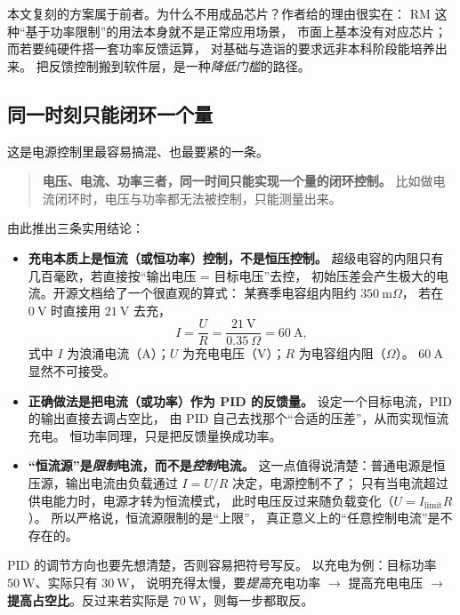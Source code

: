 \documentclass[cn,blue,11pt,device=normal]{elegantnote}
\begin{document}
本文复刻的方案属于前者。为什么不用成品芯片？作者给的理由很实在：
RM 这种“基于功率限制”的用法本身就不是正常应用场景，
市面上基本没有对应芯片；而若要纯硬件搭一套功率反馈运算，
对基础与造诣的要求远非本科阶段能培养出来。
把反馈控制搬到软件层，是一种\emph{降低门槛}的路径。

\subsection{同一时刻只能闭环一个量}

这是电源控制里最容易搞混、也最要紧的一条。

\begin{quote}
\textbf{电压、电流、功率三者，同一时间只能实现一个量的闭环控制。}
比如做电流闭环时，电压与功率都无法被控制，只能测量出来。
\end{quote}

由此推出三条实用结论：

\begin{itemize}
  \item \textbf{充电本质上是恒流（或恒功率）控制，不是恒压控制。}
  超级电容的内阻只有几百毫欧，若直接按“输出电压 = 目标电压”去控，
  初始压差会产生极大的电流。开源文档给了一个很直观的算式：
  某赛季电容组内阻约 $350\ \mathrm{m}\Omega$，
  若在 $0\ \mathrm{V}$ 时直接用 $21\ \mathrm{V}$ 去充，
  \begin{equation}\label{eq:inrush}
    I = \frac{U}{R} = \frac{21\ \mathrm{V}}{0.35\ \Omega} = 60\ \mathrm{A},
  \end{equation}
  式中 $I$ 为浪涌电流（A）；$U$ 为充电电压（V）；$R$ 为电容组内阻（$\Omega$）。
  $60\ \mathrm{A}$ 显然不可接受。
  \item \textbf{正确做法是把电流（或功率）作为 PID 的反馈量。}
  设定一个目标电流，PID 的输出直接去调占空比，
  由 PID 自己去找那个“合适的压差”，从而实现恒流充电。
  恒功率同理，只是把反馈量换成功率。
  \item \textbf{“恒流源”是\emph{限制}电流，而不是\emph{控制}电流。}
  这一点值得说清楚：普通电源是恒压源，输出电流由负载通过
  $I=U/R$ 决定，电源控制不了；
  只有当电流超过供电能力时，电源才转为恒流模式，
  此时电压反过来随负载变化（$U = I_{\text{limit}}R$）。
  所以严格说，恒流源限制的是“上限”，
  真正意义上的“任意控制电流”是不存在的。
\end{itemize}

PID 的调节方向也要先想清楚，否则容易把符号写反。
以充电为例：目标功率 $50\ \mathrm{W}$、实际只有 $30\ \mathrm{W}$，
说明充得太慢，要\emph{提高}充电功率 $\to$ 提高充电电压 $\to$
\textbf{提高占空比}。反过来若实际是 $70\ \mathrm{W}$，则每一步都取反。
\end{document}

